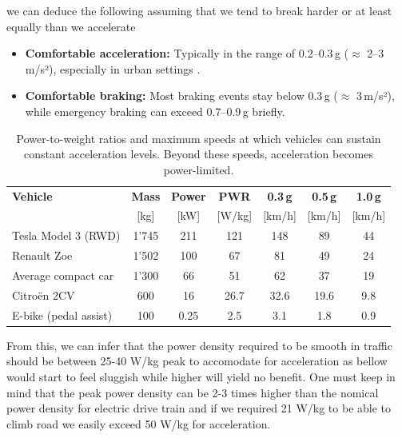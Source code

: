 we can deduce the following assuming that we tend to break harder or at least equally than we accelerate

\begin{itemize}
    \item \textbf{Comfortable acceleration:} Typically in the range of 0.2–0.3\,g ($\approx$ 2–3\,m/s²), especially in urban settings .
    \item \textbf{Comfortable braking:} Most braking events stay below 0.3\,g ($\approx$ 3\,m/s²), while emergency braking can exceed 0.7–0.9\,g briefly.
\end{itemize}


\vspace{1em}
\begin{table}[h!]
    \centering
    \renewcommand{\arraystretch}{1.3}
    \begin{tabularx}{\textwidth}{lcccccc}
        \toprule
        \textbf{Vehicle} & \textbf{Mass} & \textbf{Power} & \textbf{PWR} & \textbf{0.3\,g} & \textbf{0.5\,g} & \textbf{1.0\,g} \\
                         & [kg]         & [kW]           & [W/kg]       & [km/h]          & [km/h]          & [km/h] \\
        \midrule
        Tesla Model 3 (RWD)   & 1'745 & 211 & 121 & 148 & 89 & 44 \\
        Renault Zoe           & 1'502 & 100 & 67  & 81  & 49 & 24 \\
        Average compact car   & 1'300 & 66  & 51  & 62  & 37 & 19 \\
        Citroën 2CV           & 600    & 16  & 26.7  & 32.6  & 19.6 & 9.8 \\
        E-bike (pedal assist) & 100    & 0.25  & 2.5   & 3.1   & 1.8  & 0.9 \\
        \bottomrule
    \end{tabularx}
    \caption{Power-to-weight ratios and maximum speeds at which vehicles can sustain constant acceleration levels. Beyond these speeds, acceleration becomes power-limited.}
    \label{tab:accel_comfort_limits}
\end{table}

From this, we can infer that the power density required to be smooth in traffic should be between 25-40 W/kg peak to accomodate for acceleration as bellow would start to feel sluggish while higher will yield no benefit. One must keep in mind that the peak power density can be 2-3 times higher than the nomical power density for electric drive train and if we required 21 W/kg to be able to climb road we easily exceed 50 W/kg for acceleration.



